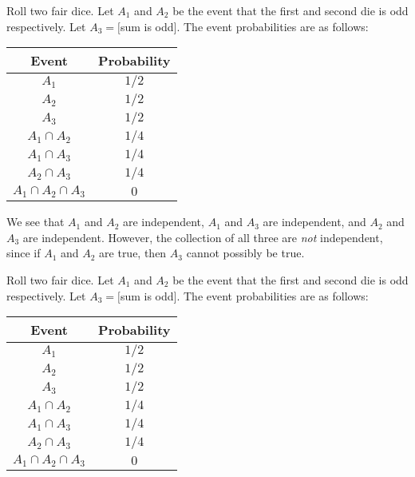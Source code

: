 \begin{note}
  \begin{field}
    \begin{eg}
      Roll two fair dice. Let $A_1$ and $A_2$ be the event that the first and second die is odd respectively. Let $A_3 = [$sum is odd$]$. The event probabilities are as follows:
      \begin{center}
        \begin{tabular}{cc}
          \toprule
          Event & Probability\\
          \midrule
          $A_1$ & $1/2$\\
          $A_2$ & $1/2$\\
          $A_3$ & $1/2$\\
          $A_1\cap A_2$ & $1/4$\\
          $A_1\cap A_3$ & $1/4$\\
          $A_2\cap A_3$ & $1/4$\\
          $A_1\cap A_2\cap A_3$ & $0$\\
          \bottomrule
        \end{tabular}
      \end{center}
      We see that $A_1$ and $A_2$ are independent, $A_1$ and $A_3$ are independent, and $A_2$ and $A_3$ are independent. However, the collection of all three are \emph{not} independent, since if $A_1$ and $A_2$ are true, then $A_3$ cannot possibly be true.
    \end{eg}
  \end{field}
  \begin{field}
    \begin{eg}
      Roll two fair dice. Let $A_1$ and $A_2$ be the event that the first and second die is odd respectively. Let $A_3 = [$sum is odd$]$. The event probabilities are as follows:
      \begin{center}
        \begin{tabular}{cc}
          \toprule
          Event & Probability\\
          \midrule
          $A_1$ & $1/2$\\
          $A_2$ & $1/2$\\
          $A_3$ & $1/2$\\
          $A_1\cap A_2$ & $1/4$\\
          $A_1\cap A_3$ & $1/4$\\
          $A_2\cap A_3$ & $1/4$\\
          $A_1\cap A_2\cap A_3$ & $0$\\

\end{tabular}
\end{center}
\end{eg}
\end{field}
\end{note}
